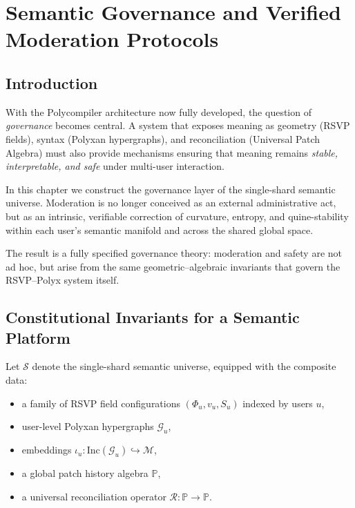 \chapter{Semantic Governance and Verified Moderation Protocols}
\label{ch:semantic-governance}

\section{Introduction}

With the Polycompiler architecture now fully developed, the question of
\emph{governance} becomes central.  
A system that exposes meaning as
geometry (RSVP fields), syntax (Polyxan hypergraphs), and reconciliation
(Universal Patch Algebra)
must also provide mechanisms ensuring that meaning remains
\emph{stable, interpretable, and safe} under multi-user interaction.

In this chapter we construct the governance layer of the
single-shard semantic universe.  
Moderation is no longer conceived as an
external administrative act, but as an intrinsic, verifiable correction
of curvature, entropy, and quine-stability
within each user's semantic manifold and across the shared global space.

The result is a fully specified governance theory:
moderation and safety are not ad hoc,
but arise from the same geometric--algebraic invariants that govern the
RSVP--Polyx system itself.

\section{Constitutional Invariants for a Semantic Platform}

Let $\mathcal{S}$ denote the single-shard semantic universe,
equipped with the composite data:

\begin{itemize}
  \item a family of RSVP field configurations $(\Phi_u, v_u, S_u)$ indexed by users $u$,
  \item user-level Polyxan hypergraphs $\mathcal{G}_u$,
  \item embeddings $\iota_u : \mathrm{Inc}(\mathcal{G}_u) \hookrightarrow \mathcal{M}$,
  \item a global patch history algebra $\mathbb{P}$,
  \item a universal reconciliation operator $\mathcal{R}: \mathbb{P} \to \mathbb{P}$.
\end{itemize}

